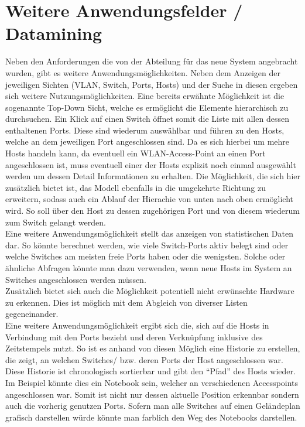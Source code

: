 \section{Weitere Anwendungsfelder / Datamining}
\label{sec:otherthoughts}

Neben den Anforderungen die von der Abteilung für das neue System angebracht wurden, gibt es weitere Anwendungsmöglichkeiten. Neben dem Anzeigen der jeweiligen Sichten (VLAN, Switch, Ports, Hosts) und der Suche in diesen ergeben sich weitere Nutzungsmöglichkeiten. Eine bereits erwähnte Möglichkeit ist die sogenannte Top-Down Sicht, welche es ermöglicht die Elemente hierarchisch zu durchsuchen. Ein Klick auf einen Switch öffnet somit die Liste mit allen dessen enthaltenen Ports. Diese sind wiederum auswählbar und führen zu den Hosts, welche an dem jeweiligen Port angeschlossen sind. Da es sich hierbei um mehre Hosts handeln kann, da eventuell ein WLAN-Access-Point an einen Port angeschlossen ist, muss eventuell einer der Hosts explizit noch einmal ausgewählt werden um dessen Detail Informationen zu erhalten. Die Möglichkeit, die sich hier zusätzlich bietet ist, das Modell ebenfalls in die umgekehrte Richtung zu erweitern, sodass auch ein Ablauf der Hierachie von unten nach oben ermöglicht wird. So soll über den Host zu dessen zugehörigen Port und von diesem wiederum zum Switch gelangt werden.\\
Eine weitere Anwendungsmöglichkeit stellt das anzeigen von statistischen Daten dar. So könnte berechnet werden, wie viele Switch-Ports aktiv belegt sind oder welche Switches am meisten freie Ports haben oder die wenigsten. Solche oder ähnliche Abfragen könnte man dazu verwenden, wenn neue Hosts im System an Switches angeschlossen werden müssen.\\ Zusätzlich bietet sich auch die Möglichkeit potentiell nicht erwünschte Hardware zu erkennen.  Dies ist möglich mit dem Abgleich von diverser Listen gegeneinander.\\
Eine weitere Anwendungsmöglichkeit ergibt sich die, sich auf die Hosts in Verbindung mit den Ports  bezieht und deren Verknüpfung inklusive des Zeitstempels nutzt. So ist es anhand von diesen Möglich eine Historie zu erstellen, die zeigt, an welchen Switches/ bzw. deren Ports der Host angeschlossen war. Diese Historie ist chronologisch sortierbar und gibt den “Pfad” des Hosts wieder. Im Beispiel könnte dies ein Notebook sein, welcher an verschiedenen Accesspoints angeschlossen war. Somit ist nicht nur dessen aktuelle Position erkennbar sondern auch die vorherig genutzen Ports. Sofern man alle Switches auf einen Geländeplan grafisch darstellen würde könnte man farblich den Weg des Notebooks darstellen.
